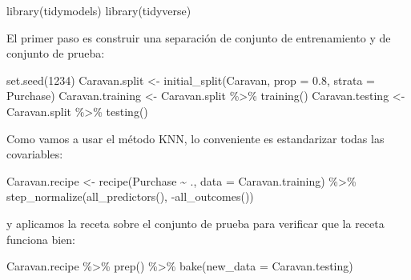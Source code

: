 \documentclass[
  12pt,
]{book}
\newenvironment{Shaded}{\begin{snugshade}}{\end{snugshade}}
\newcommand{\AttributeTok}[1]{\textcolor[rgb]{0.77,0.63,0.00}{#1}}
\newcommand{\DecValTok}[1]{\textcolor[rgb]{0.00,0.00,0.81}{#1}}
\newcommand{\FloatTok}[1]{\textcolor[rgb]{0.00,0.00,0.81}{#1}}
\newcommand{\FunctionTok}[1]{\textcolor[rgb]{0.00,0.00,0.00}{#1}}
\newcommand{\NormalTok}[1]{#1}
\newcommand{\OtherTok}[1]{\textcolor[rgb]{0.56,0.35,0.01}{#1}}
\newcommand{\SpecialCharTok}[1]{\textcolor[rgb]{0.00,0.00,0.00}{#1}}
\begin{document}
\begin{Shaded}
\begin{Highlighting}[]
\FunctionTok{library}\NormalTok{(tidymodels)}
\FunctionTok{library}\NormalTok{(tidyverse)}
\end{Highlighting}
\end{Shaded}

El primer paso es construir una separación de conjunto de entrenamiento
y de conjunto de prueba:

\begin{Shaded}
\begin{Highlighting}[]
\FunctionTok{set.seed}\NormalTok{(}\DecValTok{1234}\NormalTok{)}
\NormalTok{Caravan.split }\OtherTok{\textless{}{-}} \FunctionTok{initial\_split}\NormalTok{(Caravan, }\AttributeTok{prop =} \FloatTok{0.8}\NormalTok{,}
    \AttributeTok{strata =}\NormalTok{ Purchase)}
\NormalTok{Caravan.training }\OtherTok{\textless{}{-}}\NormalTok{ Caravan.split }\SpecialCharTok{\%\textgreater{}\%}
    \FunctionTok{training}\NormalTok{()}
\NormalTok{Caravan.testing }\OtherTok{\textless{}{-}}\NormalTok{ Caravan.split }\SpecialCharTok{\%\textgreater{}\%}
    \FunctionTok{testing}\NormalTok{()}
\end{Highlighting}
\end{Shaded}

Como vamos a usar el método KNN, lo conveniente es estandarizar todas
las covariables:

\begin{Shaded}
\begin{Highlighting}[]
\NormalTok{Caravan.recipe }\OtherTok{\textless{}{-}} \FunctionTok{recipe}\NormalTok{(Purchase }\SpecialCharTok{\textasciitilde{}}\NormalTok{ ., }\AttributeTok{data =}\NormalTok{ Caravan.training) }\SpecialCharTok{\%\textgreater{}\%}
    \FunctionTok{step\_normalize}\NormalTok{(}\FunctionTok{all\_predictors}\NormalTok{(), }\SpecialCharTok{{-}}\FunctionTok{all\_outcomes}\NormalTok{())}
\end{Highlighting}
\end{Shaded}

y aplicamos la receta sobre el conjunto de prueba para verificar que la
receta funciona bien:

\begin{Shaded}
\begin{Highlighting}[]
\NormalTok{Caravan.recipe }\SpecialCharTok{\%\textgreater{}\%}
    \FunctionTok{prep}\NormalTok{() }\SpecialCharTok{\%\textgreater{}\%}
    \FunctionTok{bake}\NormalTok{(}\AttributeTok{new\_data =}\NormalTok{ Caravan.testing)}
\end{Highlighting}
\end{Shaded}
\end{document}
